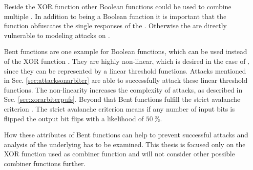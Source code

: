 Beside the \ac{XOR} function other Boolean functions could be used to combine multiple \apuf.
In addition to being a Boolean function it is important that the function obfuscates the single responses of the \apufs. Otherwise the \apufs are directly vulnerable to modeling attacks on \apufs.

Bent functions are one example for Boolean functions, which can be used instead of the \ac{XOR} function \cite{Wikipedia2016BentFunction}.
They are highly non-linear, which is desired in the case of \apufs, since they can be represented by a linear threshold functions.
Attacks mentioned in Sec. \ref{sec:attacksonarbiter} are able to successfully attack these linear threshold functions.
The non-linearity increases the complexity of attacks, as described in Sec. \ref{sec:xorarbiterpufs}. %
Beyond that Bent functions fulfill the strict avalanche criterion \cite{Wikipedia2016AvalancheEffect}.
The strict avalanche criterion means if any number of input bits is flipped the output bit flips with a likelihood of $50\ \%$.

How these attributes of Bent functions can help to prevent successful attacks and analysis of the underlying \apufs has to be examined.
This thesis is focused only on the \ac{XOR} function used as combiner function and will not consider other possible combiner functions further.

